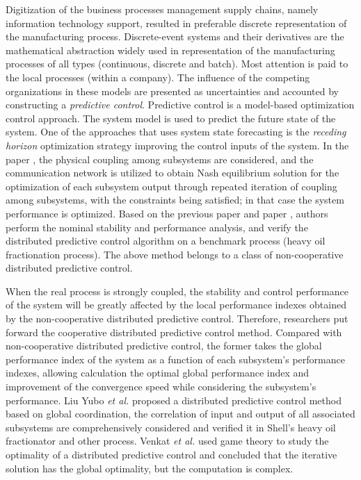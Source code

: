 \documentclass[conference,a4paper]{IEEEtran}
\begin{document}
Digitization of the business processes management supply chains, namely information technology support, resulted in preferable discrete representation of the manufacturing process. Discrete-event systems and their derivatives are the mathematical abstraction widely used in representation of the manufacturing processes of all types (continuous, discrete and batch). Most attention is paid to the local processes (within a company). The influence of the competing organizations in these models are presented as uncertainties and accounted by constructing a \emph{predictive control}.  Predictive control is a model-based optimization control approach. The system model is used to predict the future state of the system. One of the approaches that uses system state forecasting is the \emph{receding horizon} optimization strategy improving the control inputs of the system. In the paper \cite{dux}, the physical coupling among subsystems are considered, and the communication network is utilized to obtain Nash equilibrium solution for the optimization of each subsystem output through repeated iteration of coupling among subsystems, with the constraints being satisfied; in that case the system performance is optimized. Based on the previous paper \cite{dux} and paper \cite{lis}, authors perform the nominal stability and performance analysis, and verify the distributed predictive control algorithm on a benchmark process (heavy oil fractionation process). The above method belongs to a class of non-cooperative distributed predictive control.

When the real process is strongly coupled, the stability and control performance of the system will be greatly affected by the local performance indexes obtained by the non-cooperative distributed predictive control. Therefore, researchers put forward the cooperative distributed predictive control method. Compared with non-cooperative distributed predictive control, the former takes the global performance index of the system as a function of each subsystem's performance indexes, allowing calculation the optimal global performance index and improvement of the convergence speed while considering the subsystem's performance. Liu Yubo \emph{et al.} \cite{liuy} proposed a distributed predictive control method based on global coordination, the correlation of input and output of all associated subsystems are comprehensively considered and verified it in Shell's heavy oil fractionator and other process. Venkat \emph{et al.} \cite{venkat} used game theory to study the optimality of a distributed predictive control and concluded that the iterative solution has the global optimality, but the computation is complex.
\end{document}
